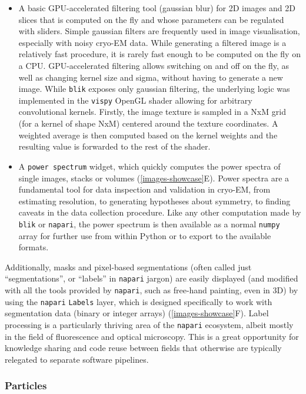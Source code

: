 \begin{itemize} 
    \item A basic GPU-accelerated filtering tool (gaussian blur) for 2D images and 2D slices that is computed on the fly and whose parameters can be regulated with sliders. Simple gaussian filters are frequently used in image visualisation, especially with noisy cryo-EM data. While generating a filtered image is a relatively fast procedure, it is rarely fast enough to be computed on the fly on a CPU. GPU-accelerated filtering allows switching on and off on the fly, as well as changing kernel size and sigma, without having to generate a new image. While \texttt{blik} exposes only gaussian filtering, the underlying logic was implemented in the \texttt{vispy} OpenGL shader allowing for arbitrary convolutional kernels. Firstly, the image texture is sampled in a NxM grid (for a kernel of shape NxM) centered around the texture coordinates. A weighted average is then computed based on the kernel weights and the resulting value is forwarded to the rest of the shader. 
    \item A \texttt{power\ spectrum} widget, which quickly computes the power spectra of single images, stacks or volumes (\autoref{images-showcase}E). Power spectra are a fundamental tool for data inspection and validation in cryo-EM, from estimating resolution, to generating hypotheses about symmetry, to finding caveats in the data collection procedure. Like any other computation made by \texttt{blik} or \texttt{napari}, the power spectrum is then available as a normal \texttt{numpy} array for further use from within Python or to export to the available formats.
\end{itemize}

Additionally, masks and pixel-based segmentations (often called just ``segmentations'', or ``labels'' in \texttt{napari} jargon) are easily displayed (and modified with all the tools provided by \texttt{napari}, such as free-hand painting, even in 3D) by using the \texttt{napari} \texttt{Labels} layer, which is designed specifically to work with segmentation data (binary or integer arrays) (\autoref{images-showcase}F). Label processing is a particularly thriving area of the \texttt{napari} ecosystem, albeit mostly in the field of fluorescence and optical microscopy. This is a great opportunity for knowledge sharing and code reuse between fields that otherwise are typically relegated to separate software pipelines.

\subsubsection{Particles}\label{particles}

